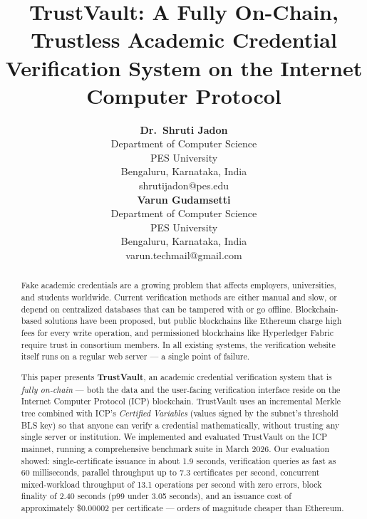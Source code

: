 \documentclass[journal]{IEEEtran}
\begin{document}
\title{TrustVault: A Fully On-Chain, Trustless Academic Credential Verification System on the Internet Computer Protocol}

\author{%
  \begin{tabular}[t]{c}
    \textbf{Dr.\ Shruti Jadon} \\
    Department of Computer Science \\
    PES University \\
    Bengaluru, Karnataka, India \\
    shrutijadon@pes.edu
  \end{tabular}
  \hspace{1.5cm}
  \begin{tabular}[t]{c}
    \textbf{Varun Gudamsetti} \\
    Department of Computer Science \\
    PES University \\
    Bengaluru, Karnataka, India \\
    varun.techmail@gmail.com
  \end{tabular}
}



\maketitle

\begin{abstract}
Fake academic credentials are a growing problem that affects employers, universities, and students worldwide. Current verification methods are either manual and slow, or depend on centralized databases that can be tampered with or go offline. Blockchain-based solutions have been proposed, but public blockchains like Ethereum charge high fees for every write operation, and permissioned blockchains like Hyperledger Fabric require trust in consortium members. In all existing systems, the verification website itself runs on a regular web server — a single point of failure.

This paper presents \textbf{TrustVault}, an academic credential verification system that is \emph{fully on-chain} — both the data and the user-facing verification interface reside on the Internet Computer Protocol (ICP) blockchain. TrustVault uses an incremental Merkle tree combined with ICP's \emph{Certified Variables} (values signed by the subnet's threshold BLS key) so that anyone can verify a credential mathematically, without trusting any single server or institution. We implemented and evaluated TrustVault on the ICP mainnet, running a comprehensive benchmark suite in March 2026. Our evaluation showed: single-certificate issuance in about 1.9 seconds, verification queries as fast as 60 milliseconds, parallel throughput up to 7.3 certificates per second, concurrent mixed-workload throughput of 13.1 operations per second with zero errors, block finality of 2.40 seconds (p99 under 3.05 seconds), and an issuance cost of approximately \$0.00002 per certificate — orders of magnitude cheaper than Ethereum.
\end{abstract}
\end{document}
